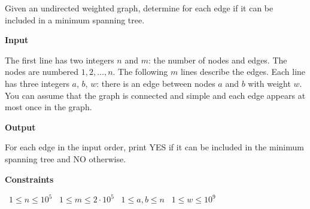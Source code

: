 Given an undirected weighted graph, determine for each edge if it can be included in a minimum spanning tree.

\vspace{0.3cm}\noindent\textbf{Input}

The first line has two integers $n$ and $m$: the number of nodes and edges. The nodes are numbered $1,2,\dots,n$.
The following $m$ lines describe the edges. Each line has three integers $a$, $b$, $w$: there is an edge between nodes $a$ and $b$ with weight $w$.
You can assume that the graph is connected and simple and each edge appears at most once in the graph.

\vspace{0.3cm}\noindent\textbf{Output}

For each edge in the input order, print YES if it can be included in the minimum spanning tree and NO otherwise.

\vspace{0.3cm}\noindent\textbf{Constraints}

\textbullet\ $1 \le n \le 10^5$
\textbullet\ $1 \le m \le 2 \cdot 10^5$
\textbullet\ $1 \le a,b \le n$
\textbullet\ $1 \le w \le 10^9$